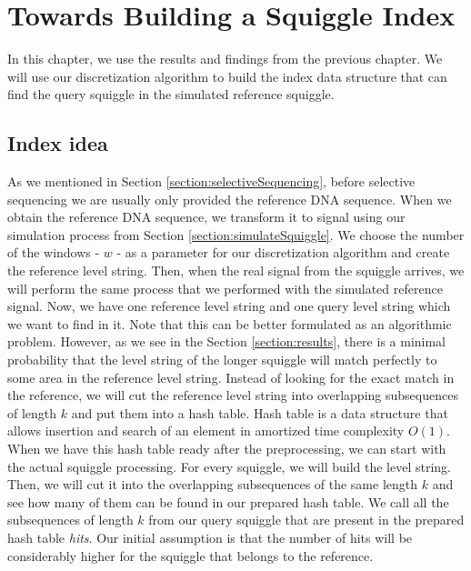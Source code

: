 \chapter{Towards Building a Squiggle Index}

\label{kap:methAdjust}

In this chapter, we use the results and findings from the previous chapter. We will
use our discretization algorithm to build the index data structure that can
find the query squiggle in the simulated reference squiggle.

\section{Index idea}
\label{section:indexIdea}

As we mentioned in Section \ref{section:selectiveSequencing}, before selective sequencing
we are usually only provided the reference DNA sequence.
When we obtain the reference DNA sequence, we transform it to signal using our simulation
process from Section \ref{section:simulateSquiggle}. We choose the number of the windows - $w$ -
as a parameter for our discretization algorithm and create the reference level string.
Then, when the real signal from the squiggle arrives, we will perform the same process
that we performed with the simulated reference signal. Now, we have one reference level string and
one query level string which we want to find in it. Note that this can be better formulated as an
algorithmic problem. However, as we see in the Section \ref{section:results}, there is a minimal probability that the level string
of the longer squiggle will match perfectly to some area in the reference level string.
Instead of looking for the exact match in the reference, we will cut the reference
level string into overlapping subsequences of length $k$ and put them into a hash table.
Hash table is a data structure that allows insertion and search of an element in
amortized time complexity $O(1)$. When we have this hash table ready after the
preprocessing, we can start with the actual squiggle processing. For every squiggle, we will
build the level string. Then, we will cut it into the overlapping
subsequences of the same length $k$ and see how many of them can be found in our
prepared hash table. We call all the subsequences of length $k$ from our query squiggle that are
present in the prepared hash table \textit{hits}. Our initial assumption is that the number
of hits will be considerably higher for the squiggle that belongs to the reference.

